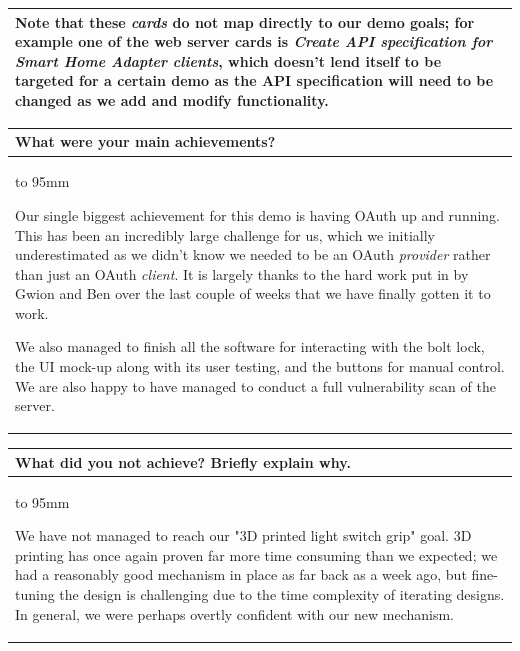 \documentclass[a4paper]{article}
\newcommand{\colWidth}{141mm}
\begin{document}
\begin{center}
\begin{tabular}{|p{\colWidth}|}
		\vspace{3mm}

		Note that these \textit{cards} do not map directly to our demo goals; for example one of the web server cards is \textit{Create API specification for Smart Home Adapter clients},
		which doesn't lend itself to be targeted for a certain demo as the API specification will need to be changed as we add and modify functionality.
	
  \\
  \hline
\end{tabular}
\vskip 5mm


\begin{tabular}{|p{\colWidth}|}
	\hline
	\cellcolor{blue!25}\large
	\textbf{What were your main achievements?}
	\\ \hline
	\vtop to 95mm{
		Our single biggest achievement for this demo is having OAuth up and running.
		This has been an incredibly large challenge for us, which we initially underestimated as we didn't know we
		needed to be an OAuth \textit{provider} rather than just an OAuth \textit{client}.
		It is largely thanks to the hard work put in by Gwion and Ben over the last couple of weeks that
		we have finally gotten it to work.
		
		\vspace{3mm}
		
		We also managed to finish all the software for interacting with the bolt lock, the UI mock-up along with its user testing, and the buttons for manual control. We are also happy to have managed to conduct a full vulnerability scan of the server.
	}
  \\
  \hline
\end{tabular}
\vskip 5mm


\begin{tabular}{|p{\colWidth}|}
	\hline
	\cellcolor{blue!25}\large
	\textbf{What did you not achieve? Briefly explain why.}
	\\ \hline
	\vtop to 95mm{
		We have not managed to reach our "3D printed light switch grip" goal.
		3D printing has once again proven far more time consuming than we expected; we had a
		reasonably good mechanism in place as far back as a week ago, but fine-tuning the
		design is challenging due to the time complexity of iterating designs. In general,
		we were perhaps overtly confident with our new mechanism.
		
}
\end{tabular}
\end{center}
\end{document}
